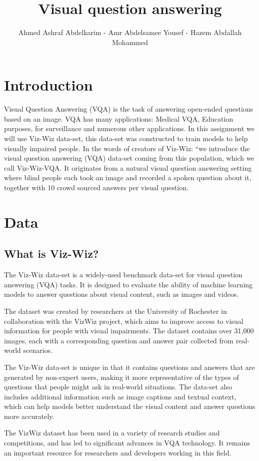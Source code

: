 \documentclass{report}
\author{Ahmed Ashraf Abdelkarim - Amr Abdelsamee Yousef - Hazem Abdallah Mohammed}
\title{Visual question answering}
\begin{document}
\maketitle
\tableofcontents
\section{Introduction}
Visual Question Answering (VQA) is the task of answering open-ended questions based on an image. VQA has many applications: Medical VQA, Education purposes, for surveillance and numerous other applications. In this assignment we will use Viz-Wiz data-set, this data-set was constructed to train models to help visually impaired people. In the words of creators of Viz-Wiz: “we introduce the visual question answering (VQA) data-set coming from this population, which we call Viz-Wiz-VQA. It originates from a natural visual question answering setting where blind people each took an image and recorded a spoken question about it, together with 10 crowd sourced answers per visual question.

\section{Data}
\subsection{What is Viz-Wiz?}
The Viz-Wiz data-set is a widely-used benchmark data-set for visual question answering (VQA) tasks. It is designed to evaluate the ability of machine learning models to answer questions about visual content, such as images and videos.

The dataset was created by researchers at the University of Rochester in collaboration with the VizWiz project, which aims to improve access to visual information for people with visual impairments. The dataset contains over 31,000 images, each with a corresponding question and answer pair collected from real-world scenarios.

The Viz-Wiz data-set is unique in that it contains questions and answers that are generated by non-expert users, making it more representative of the types of questions that people might ask in real-world situations. The data-set also includes additional information such as image captions and textual context, which can help models better understand the visual content and answer questions more accurately.

The VizWiz dataset has been used in a variety of research studies and competitions, and has led to significant advances in VQA technology. It remains an important resource for researchers and developers working in this field.
\end{document}
